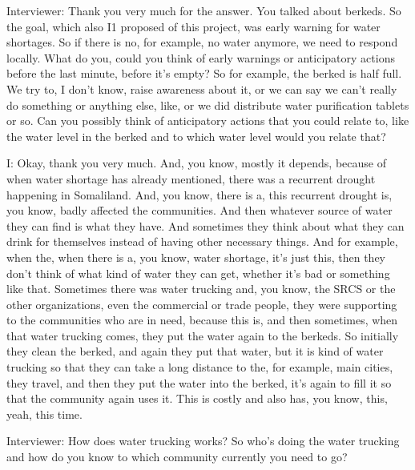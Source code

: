 Interviewer:   Thank you very much for the answer. You talked about berkeds. So the goal, which also I1 proposed of this project, was early warning for water shortages. So if there is no, for example, no water anymore, we need to respond locally. What do you, could you think of early warnings or anticipatory actions before the last minute, before it's empty? So for example, the berked is half full. We try to, I don't know, raise awareness about it, or we can say we can't really do something or anything else, like, or we did distribute water purification tablets or so. Can you possibly think of anticipatory actions that you could relate to, like the water level in the berked and to which water level would you relate that? 

I: Okay, thank you very much. And, you know, mostly it depends, because of when water shortage has already mentioned, there was a recurrent drought happening in Somaliland. And, you know, there is a, this recurrent drought is, you know, badly affected the communities. And then whatever source of water they can find is what they have. And sometimes they think about what they can drink for themselves instead of having other necessary things. And for example, when the, when there is a, you know, water shortage, it's just this, then they don't think of what kind of water they can get, whether it's bad or something like that. Sometimes there was water trucking and, you know, the SRCS or the other organizations, even the commercial or trade people, they were supporting to the communities who are in need, because this is, and then sometimes, when that water trucking comes, they put the water again to the berkeds. So initially they clean the berked, and again they put that water, but it is kind of water trucking so that they can take a long distance to the, for example, main cities, they travel, and then they put the water into the berked, it's again to fill it so that the community again uses it. This is costly and also has, you know, this, yeah, this time. 

Interviewer:  How does water trucking works? So who's doing the water trucking and how do you know to which community currently you need to go? 

